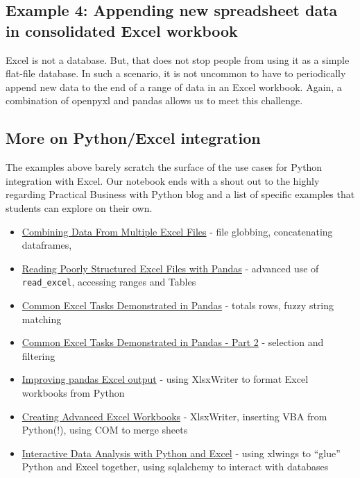 \documentclass[ited,blindrev]{informs3}              %
\begin{document}
\subsection{Example 4: Appending new spreadsheet data in consolidated Excel workbook}

Excel is not a database. But, that does not stop people from using it as a simple flat-file database. In such a scenario, it is not uncommon to have to periodically append new data to the end of a range of data in an Excel workbook. Again, a combination of openpyxl and pandas allows us to meet this challenge.

\subsection{More on Python/Excel integration}

The examples above barely scratch the surface of the use cases for Python integration with Excel. Our notebook ends with a shout out to the highly regarding Practical Business with Python blog and a list of specific examples that students can explore on their own.

\begin{itemize}
	\tightlist
	\item
	\href{https://pbpython.com/excel-file-combine.html}{Combining Data
		From Multiple Excel Files} - file globbing, concatenating dataframes,
	\item
	\href{https://pbpython.com/pandas-excel-range.html}{Reading Poorly
		Structured Excel Files with Pandas} - advanced use of
	\texttt{read\_excel}, accessing ranges and Tables
	\item
	\href{https://pbpython.com/excel-pandas-comp.html}{Common Excel Tasks
		Demonstrated in Pandas} - totals rows, fuzzy string matching
	\item
	\href{https://pbpython.com/excel-pandas-comp-2.html}{Common Excel
		Tasks Demonstrated in Pandas - Part 2} - selection and filtering
	\item
	\href{https://pbpython.com/improve-pandas-excel-output.html}{Improving
		pandas Excel output} - using XlsxWriter to format Excel workbooks from
	Python
	\item
	\href{https://pbpython.com/advanced-excel-workbooks.html}{Creating
		Advanced Excel Workbooks} - XlsxWriter, inserting VBA from Python(!),
	using COM to merge sheets
	\item
	\href{https://pbpython.com/xlwings-pandas-excel.html}{Interactive Data
		Analysis with Python and Excel} - using xlwings to ``glue'' Python and
	Excel together, using sqlalchemy to interact with databases
\end{itemize}
\end{document}
